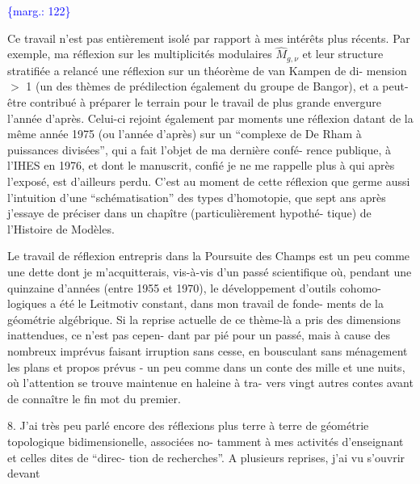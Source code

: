 \documentclass[11pt]{article}
\newcommand{\scanpage}[1]{\par\bigskip\noindent{\small\sffamily[scan #1]}\par}
\newcommand{\mspage}[1]{{\small\sffamily[p.\,#1]}}
\let\over\relax
\newcommand{\over}[2]{\textcolor{gray}{#1}\textcolor{blue}{\ensuremath{^{\!\nearrow}}#2}}
\newcommand{\margin}[1]{\textcolor{blue}{\{\textsf{marg.:} #1\}}}
\newcommand{\unsure}[1]{[#1?]}
\begin{document}
\margin{122}

\clearpage
\scanpage{119/123}
\mspage{45}

Ce travail n'est pas entièrement isolé par rapport à
mes intérêts plus récents. Par exemple, ma réflexion sur les
multiplicités modulaires $\widehat{M}_{g,\nu}$ et leur structure stratifiée
a relancé une réflexion sur un théorème de van Kampen de di-%
mension $>$ 1 (un des thèmes de prédilection également du groupe
de Bangor), et a peut-être contribué à préparer le terrain pour
le travail de plus grande envergure l'année d'après. Celui-ci
rejoint également par moments une réflexion datant de la même
année 1975 (ou l'année d'après) sur un ``complexe de De Rham à
puissances divisées'', qui a fait l'objet de ma dernière confé-%
rence publique, à l'IHES en 1976, et dont le manuscrit, confié
je ne me rappelle plus à qui après l'exposé, est d'ailleurs perdu.
C'est au moment de cette réflexion que germe aussi l'intuition
d'une ``schématisation'' des types d'homotopie, que sept ans après
j'essaye de préciser dans un chapître (particulièrement hypothé-%
tique) de l'Histoire de Modèles.

Le travail de réflexion entrepris dans la Poursuite
des Champs est un peu comme une dette dont je m'acquitterais,
vis-à-vis d'un passé scientifique où, pendant une quinzaine
d'années (entre 1955 et 1970), le développement d'outils cohomo-%
logiques a été le Leitmotiv constant, dans mon travail de fonde-%
ments de la géométrie algébrique. Si la reprise actuelle de ce
thème-là a pris des dimensions inattendues, ce n'est pas cepen-%
dant par pi\over{ti}{\unsure{ét}}é pour un passé, mais à cause des nombreux imprévus
faisant irruption sans cesse, en bousculant sans ménagement les
plans et propos prévus - un peu comme dans un conte des mille et
une nuits, où l'attention se trouve maintenue en haleine à tra-%
vers vingt autres contes avant de connaître le fin mot du premier.


8. J'ai très peu parlé encore des réflexions plus terre
à terre de géométrie topologique bidimensionelle, associées no-%
tamment à mes activités d'enseignant et celles dites de ``direc-%
tion de recherches''. A plusieurs reprises, j'ai vu s'ouvrir devant
\end{document}
